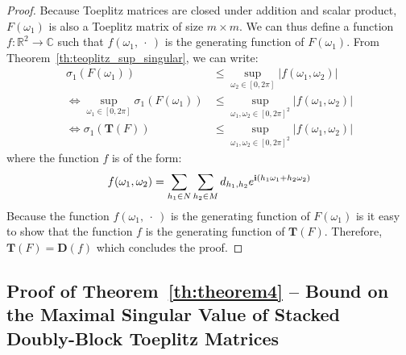 \begin{proof}
Because Toeplitz matrices are closed under addition and scalar product, $F(\omega_1)$ is also a Toeplitz matrix of size $m \times m$. 
We can thus define a function $f:\mathbb{R}^{2} \rightarrow \mathbb{C}$ such that $f(\omega_1,\ \cdot\ )$ is the generating function of $F(\omega_1)$. From Theorem~\ref{th:teoplitz_sup_singular}, we can write:
\begin{align}
    \sigma_{1}\left( F(\omega_1) \right) &\leq \sup_{\omega_2 \in [0,2\pi]} \left| f(\omega_1, \omega_2) \right| \\
    \Leftrightarrow \sup_{\omega_1 \in [0,2\pi]} \sigma_{1}\left( F(\omega_1) \right) &\leq  \sup_{\omega_1, \omega_2 \in [0,2\pi]^2} \left| f(\omega_1, \omega_2) \right| \\
    \Leftrightarrow \sigma_1\left(\mathbf{T}(F) \right) &\leq \sup_{\omega_1, \omega_2 \in [0,2\pi]^2} \left| f(\omega_1, \omega_2) \right|
\end{align}
where the function $f$ is of the form:
\begin{equation}
f(\omega_1,\omega_2) = \sum_{h_1 \in N} \sum_{h_2 \in M} d_{h_1, h_2} e^{\ci \left( h_1\omega_1 + h_2 \omega_2\right)}
\end{equation}
Because the function $f(\omega_1,\ \cdot\ )$ is the generating function of $F(\omega_1)$ is it easy to show that the function $f$ is the generating function of $\mathbf{T}(F)$. Therefore, $\mathbf{T}(F) = \mathbf{D}(f)$ which concludes the proof. 
\end{proof}

\subsection{Proof of Theorem~\ref{th:theorem4} -- Bound on the Maximal Singular Value of Stacked Doubly-Block Toeplitz Matrices}


